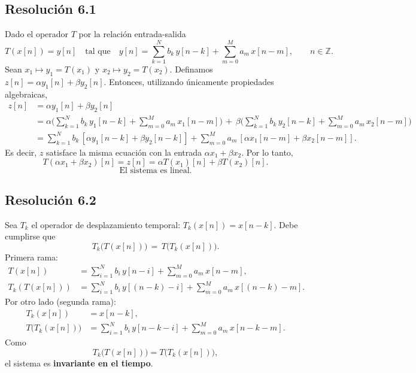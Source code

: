 \documentclass[
  11pt,
  letterpaper,
   addpoints,
  ]{exam}
\begin{document}
\begin{questions}
\begin{solution}
\subsection*{Resolución 6.1}
Dado el operador $T$ por la relación entrada-salida
\[
  T(x[n]) = y[n] \quad \text{tal que} \quad
  y[n]=\sum_{k=1}^{N} b_k\,y[n-k]+\sum_{m=0}^{M} a_m\,x[n-m],\qquad n\in\mathbb Z.
\]
 Sean $x_1\mapsto y_1=T(x_1)$ y $x_2\mapsto y_2=T(x_2)$. Definamos
\( z[n] = \alpha y_1[n] + \beta y_2[n] \). Entonces, utilizando únicamente propiedades algebraicas,
\begin{align}
  z[n]
   &= \alpha y_1[n] + \beta y_2[n] \\
   &= \alpha\Big(\sum_{k=1}^{N} b_k\,y_1[n-k] + \sum_{m=0}^{M} a_m\,x_1[n-m]\Big)
    \, +\, \beta\Big(\sum_{k=1}^{N} b_k\,y_2[n-k] + \sum_{m=0}^{M} a_m\,x_2[n-m]\Big) \\
   &= \sum_{k=1}^{N} b_k\,[\alpha y_1[n-k]+\beta y_2[n-k]]
      + \sum_{m=0}^{M} a_m\,[\alpha x_1[n-m]+\beta x_2[n-m]].
\end{align}
Es decir, $z$ satisface la misma ecuación con la entrada $\alpha x_1+\beta x_2$. Por lo tanto,
\[
  T(\alpha x_1+\beta x_2)[n] = z[n] = \alpha T(x_1)[n] + \beta T(x_2)[n].
\]
\[\boxed{\text{El sistema es lineal.}}\]

\subsection*{Resolución 6.2}
Sea $T_k$ el operador de desplazamiento temporal: $T_k(x[n])=x[n-k]$. Debe cumplirse que
\begin{equation}
  T_k\big(T(x[n])\big) \,=\, T\big(T_k(x[n])\big).
\end{equation}
\noindent
Primera rama:
\begin{align}
  T(x[n]) &= \sum_{i=1}^{N} b_i\,y[n-i] + \sum_{m=0}^{M} a_m\,x[n-m], \\
  T_k\!\left(T(x[n])\right) &= \sum_{i=1}^{N} b_i\,y[(n-k)-i] + \sum_{m=0}^{M} a_m\,x[(n-k)-m].
\end{align}
Por otro lado (segunda rama):
\begin{align}
  T_k(x[n]) &= x[n-k], \\
  T\big(T_k(x[n])\big) &= \sum_{i=1}^{N} b_i\,y[n-k-i] + \sum_{m=0}^{M} a_m\,x[n-k-m].
\end{align}
Como
\[
  T_k\big(T(x[n])\big) = T\big(T_k(x[n])\big),
\]
el sistema es \textbf{invariante en el tiempo}.


\end{solution}
\end{questions}
\end{document}
